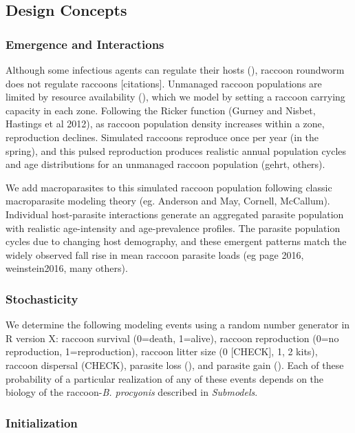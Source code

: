 \documentclass[11pt]{article}
\begin{document}
\subsection{Design Concepts}

\subsubsection{Emergence and Interactions}

Although some infectious agents can regulate their hosts (), raccoon
roundworm does not regulate raccoons [citations]. Unmanaged raccoon populations are
limited by resource availability (), which we model by setting a raccoon
carrying capacity in each zone. Following the Ricker function (Gurney
and Nisbet, Hastings et al 2012), as raccoon population density
increases within a zone, reproduction declines. Simulated raccoons
reproduce once per year (in the spring), and this pulsed reproduction
produces realistic annual population cycles and age distributions for an
unmanaged raccoon population (gehrt, others).

We add macroparasites to this simulated raccoon population following
classic macroparasite modeling theory (eg. Anderson and May, Cornell,
McCallum). Individual host-parasite interactions generate an aggregated
parasite population with realistic age-intensity and age-prevalence
profiles. The parasite population cycles due to
changing host demography, and these emergent patterns match the widely
observed fall rise in mean raccoon parasite loads (eg page 2016,
weinstein2016, many others).

\subsubsection{Stochasticity}

We determine the following modeling events using a random number generator in R version X: raccoon survival (0=death, 1=alive), raccoon reproduction (0=no reproduction, 1=reproduction), raccoon litter size (0 [CHECK], 1, 2 kits), raccoon dispersal (CHECK), parasite loss (), and parasite gain ().  Each of these probability of a particular realization of any of these events depends on the biology of the raccoon-\emph{B. procyonis} described in \emph{Submodels}.

\subsubsection{Initialization}
\end{document}

